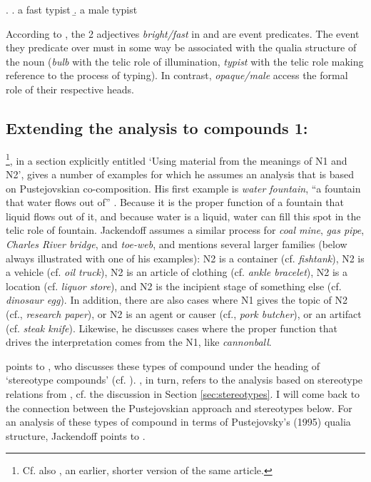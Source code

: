 \ex. \label{ex:pust1995:p89:ex7}
\a. a fast typist
\b. a male typist

According to \citet[89]{Pustejovsky:1995}, the 2 adjectives
\emph{bright/fast} in \LLast and \Last are event predicates. The event
they predicate over must in some way be associated with the qualia
structure of the noun (\emph{bulb} with the telic role of
illumination, \emph{typist} with the telic role making reference to
the process of typing). In contrast, 
\emph{opaque/male} access the  formal role of their respective heads.

\subsection{Extending the analysis to compounds 1: \citet{Jackendoff:2010}}
\label{sec:jackendoff}

\citet[442--445]{Jackendoff:2010}\footnote{Cf. also \citet{Jackendoff:2009},
  an earlier, shorter version of the same article.}, in a section
explicitly entitled `Using material from the meanings of N1 and N2', gives a number of
examples for which he assumes an analysis that is based on
Pustejovskian co-composition. His first example is \emph{water
  fountain}, ``a fountain that water flows out
of'' \citep[443]{Jackendoff:2010}. Because it is the proper function of
a fountain that liquid flows out of it, and because water is a
liquid, water can fill this spot in the telic role of
fountain. Jackendoff assumes a similar process for \emph{coal mine},
\emph{gas pipe}, \emph{Charles River bridge}, and \emph{toe-web}, and
mentions several larger families (below always illustrated with one of
his examples): N2 is a container (cf.
\emph{fishtank}), N2 is a vehicle (cf. \emph{oil truck}),
N2 is an article of clothing (cf. \emph{ankle bracelet}), N2 is
a location (cf. \emph{liquor store}), and N2 is the
incipient stage of something else (cf. \emph{dinosaur egg}). In addition, there are also cases
where N1 gives the topic of N2 (cf., \emph{research paper}), or
N2 is an agent or causer (cf., \emph{pork butcher}), or an
artifact (cf. \emph{steak knife}). Likewise, he discusses cases where the proper function
that drives the interpretation comes from the N1, like \emph{cannonball}. 

\citet[443, Footnote 22]{Jackendoff:2010} points to \citet{Brekle:1986},
who discusses these types of compound under the heading of `stereotype
compounds' (cf. \citealt[42, Section 2.2]{Brekle:1986}). \citeauthor{Brekle:1986}, in turn,
refers to the analysis based on stereotype relations from
\citet{Fanselow:1981}, cf. the discussion in Section \ref{sec:stereotypes}. I will come back to the connection
between the Pustejovskian approach and stereotypes below. %
For an analysis of these types of compound in terms of Pustejovsky's
(1995) qualia structure, Jackendoff points to
\citet{Bassac:2006}. %

